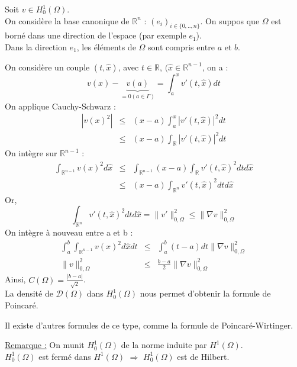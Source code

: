 
\begin{dem}
Soit $v\in H_0^1(\Omega)$. \\
On considère la base canonique de $\mathbb{R}^n$ : $(e_i)_{i\in\{0,..,n\}}$. On suppos que $\Omega$ est borné dans une direction de l'espace (par exemple $e_1$).\\
Dans la direction $e_1$, les éléments de $\Omega$ sont compris entre $a$ et $b$.

\bigskip
On considère un couple $(t,\hat{x})$, avec $t\in \mathbb{R}$, $(\hat{x}\in\mathbb{R}^{n-1}$, on a :
	\[v(x)-\underbrace{v(a)}_{=0 (a\in\Gamma)} = \int_a^x v'(t,\hat{x})dt\]
On applique Cauchy-Schwarz :
\begin{eqnarray*}
	|v(x)^2|&\leq& (x-a)\int_a^x |v'(t,\hat{x})|^2dt\\
		&\leq& (x-a)\int_{\mathbb{R}} |v'(t,\hat{x})|^2 dt
\end{eqnarray*}
On intègre sur $\mathbb{R}^{n-1}$ :
\begin{eqnarray*}
	\int_{\mathbb{R}^{n-1}} v(x)^2 d\hat{x} &\leq& \int_{\mathbb{R}^{n-1}} (x-a) \int_{\mathbb{R}} v'(t,\hat{x})^2 dt d\hat{x} \\
					&\leq& (x-a) \int_{\mathbb{R}^n} v'(t,\hat{x})^2 dt d\hat{x}
\end{eqnarray*}
Or, \[\int_{\mathbb{R}^n} v'(t,\hat{x})^2 dtd\hat{x} = \|v'\|^2_{0,\Omega} \leq \|\nabla v\|^2_{0,\Omega}\]
On intègre à nouveau entre a et b :
\begin{eqnarray*}
	\int_a^b \int_{\mathbb{R}^{n-1}} v(x)^2 d\hat{x}dt &\leq& \int_a^b (t-a) dt \|\nabla v\|^2_{0,\Omega}\\
			\|v\|^2_{0,\Omega} &\leq& \frac{b-a}{2} \|\nabla v\|^2_{0,\Omega}
\end{eqnarray*}
Ainsi, $C(\Omega)=\frac{|b-a|}{\sqrt{2}}$.\\
La densité de $\mathcal{D}(\Omega)$ dans $H_0^1(\Omega)$ nous permet d'obtenir la formule de Poincaré.
\end{dem}

Il existe d'autres formules de ce type, comme la formule de Poincaré-Wirtinger.

\bigskip
\underline{Remarque :} On munit $H_0^1(\Omega)$ de la norme induite par $H^1(\Omega)$.\\
$H_0^1(\Omega)$ est fermé dans $H^1(\Omega)$ $\Rightarrow$ $H_0^1(\Omega)$ est de Hilbert.

